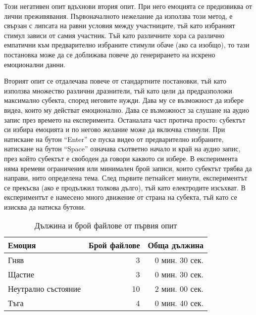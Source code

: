 \documentclass[main.tex]{subfiles}
\begin{document}
Този негативен опит вдъхнови втория опит. При него емоцията се предизвиква от лични преживявания. Първоначалното нежелание да използва този метод, е свързан с липсата на равни условия между участниците, тъй като избраният стимул зависи от самия участник. Тъй като различните хора са различно емпатични към предварително избраните стимули обаче (ако са изобщо), то тази постановка може да се доближава повече до генерирането на искрено емоционални данни.

Вторият опит се отдалечава повече от стандартните постановки, тъй като използва множество различни дразнители, тъй като цели да предразположи максимално субекта, според неговите нужди. Дава му се възможност да избере видеа, които му действат емоционално. Дава се възможност за слушане на аудио запис през времето на експеримента. Останалата част протича просто: субектът си избира емоцията и по негово желание може да включва стимули. При натискане на бутон ``Enter'' се пуска видео от предварително избраните, натискане на бутон ``Space'' означава съответно начало и край на аудио запис, през който субектът е свободен да говори каквото си избере. В експеримента няма времеви ограничения или минимален брой записи, които субектът трябва да направи, нито определена тема. След първите петнайсет минути, експериментът се прекъсва (ако е продължил толкова дълго), тъй като електродите изсъхват. В експериментът е намесено много движение от страна на субекта, тъй като се изисква да натиска бутони.

\begin{table}[h]
    \begin{center}
    \begin{tabular}{|l|r|r|} 
        \hline
        Емоция & Брой файлове & Обща дължина\\ 
        \hline
        Гняв & 3 & 0 мин. 30 сек.\\ 
        Щастие & 3 & 0 мин. 30 сек.\\ 
        Неутрално състояние & 10 & 2 мин. 00 сек. \\ 
        Тъга & 4 & 0 мин. 40 сек. \\ 
        \hline
    \end{tabular}
    \caption{Дължина и брой файлове от първия опит}
    \label{tab:brain:results:01}
    \end{center}
\end{table}        
\end{document}
